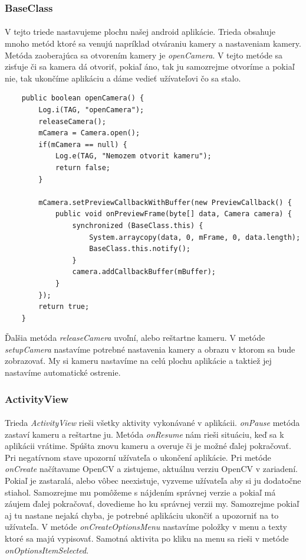 \documentclass[12pt]{article}
\begin{document}
\subsubsection{BaseClass}
\paragraph{}
V tejto triede nastavujeme plochu našej android aplikácie.
Trieda obsahuje mnoho metód ktoré sa venujú napríklad otváraniu kamery a nastaveniam kamery. Metóda zaoberajúca sa otvorením kamery je \emph{openCamera}.
V tejto metóde sa zisťuje či sa kamera dá otvoriť, pokiaľ áno, tak ju samozrejme otvoríme a pokiaľ nie, tak ukončíme aplikáciu a dáme vedieť užívateľovi čo sa stalo.
\begin{lstlisting}
	public boolean openCamera() {
        Log.i(TAG, "openCamera");
        releaseCamera();
        mCamera = Camera.open();
        if(mCamera == null) {
        	Log.e(TAG, "Nemozem otvorit kameru");
        	return false;
        }

        mCamera.setPreviewCallbackWithBuffer(new PreviewCallback() {
            public void onPreviewFrame(byte[] data, Camera camera) {
                synchronized (BaseClass.this) {
                    System.arraycopy(data, 0, mFrame, 0, data.length);
                    BaseClass.this.notify(); 
                }
                camera.addCallbackBuffer(mBuffer);
            }
        });
        return true;
    }
\end{lstlisting}
Ďalšia metóda \emph{releaseCamera} uvoľní, alebo reštartne kameru. V metóde \emph{setupCamera} nastavíme potrebné nastavenia kamery a obrazu v ktorom sa bude zobrazovať.
My si kameru nastavíme na celú plochu aplikácie a taktiež jej nastavíme automatické ostrenie.
\subsubsection{ActivityView}
\paragraph{}
Trieda \emph{ActivityView} rieši všetky aktivity vykonávané v aplikácii. \emph{onPause} metóda zastaví kameru a reštartne ju. Metóda \emph{onResume} nám rieši situáciu, keď sa k aplikácii vrátime.
Spúšta znovu kameru a overuje či je možné ďalej pokračovať. Pri negatívnom stave upozorní užívateľa o ukončení aplikácie. Pri metóde \emph{onCreate} načítavame OpenCV a zistujeme, aktuálnu verziu OpenCV v zariadení.
Pokiaľ je zastaralá, alebo vôbec neexistuje, vyzveme užívateľa aby si ju dodatočne stiahol. Samozrejme mu pomôžeme s nájdením správnej verzie a pokiaľ má záujem ďalej pokračovať, dovedieme ho ku správnej verzii my.
Samozrejme pokiaľ aj tu nastane nejaká chyba, je potrebné aplikáciu ukončiť a upozorniť na to užívateľa. V metóde \emph{onCreateOptionsMenu} nastavíme položky v menu a texty ktoré sa majú vypisovať. 
Samotná aktivita po kliku na menu sa rieši v metóde \emph{onOptionsItemSelected}.
\end{document}
